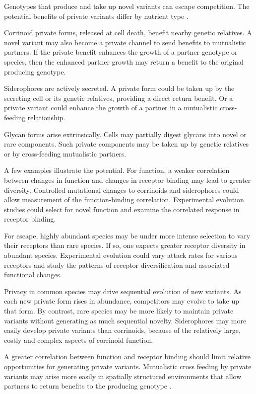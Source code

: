 \documentclass[\mydocfontsize]{article}
\begin{document}
\begin{multicols}{2}
 Genotypes that produce and take up novel variants can escape competition. The potential benefits of private variants differ by nutrient type \autocite{degnan14human,niehus17the-evolution}. 

Corrinoid private forms, released at cell death, benefit nearby genetic relatives. A novel variant may also become a private channel to send benefits to mutualistic partners. If the private benefit enhances the growth of a partner genotype or species, then the enhanced partner growth may return a benefit to the original producing genotype.

Siderophores are actively secreted. A private form could be taken up by the secreting cell or its genetic relatives, providing a direct return benefit. Or a private variant could enhance the growth of a partner in a mutualistic cross-feeding relationship. 

Glycan forms arise extrinsically. Cells may partially digest glycans into novel or rare components. Such private components may be taken up by genetic relatives or by cross-feeding mutualistic partners. 

 A few examples illustrate the potential. For function, a weaker correlation between changes in function and changes in receptor binding may lead to greater diversity. Controlled mutational changes to corrinoids and siderophores could allow measurement of the function-binding correlation. Experimental evolution studies could select for novel function and examine the correlated response in receptor binding.

For escape, highly abundant species may be under more intense selection to vary their receptors than rare species. If so, one expects greater receptor diversity in abundant species. Experimental evolution could vary attack rates for various receptors and study the patterns of receptor diversification and associated functional changes. 

Privacy in common species may drive sequential evolution of new variants. As each new private form rises in abundance, competitors may evolve to take up that form. By contrast, rare species may be more likely to maintain private variants without generating as much sequential novelty. Siderophores may more easily develop private variants than corrinoids, because of the relatively large, costly and complex aspects of corrinoid function. 

A greater correlation between function and receptor binding should limit relative opportunities for generating private variants. Mutualistic cross feeding by private variants may arise more easily in spatially structured environments that allow partners to return benefits to the producing genotype \autocite{pande16privatization}. 


\end{multicols}
\end{document}
